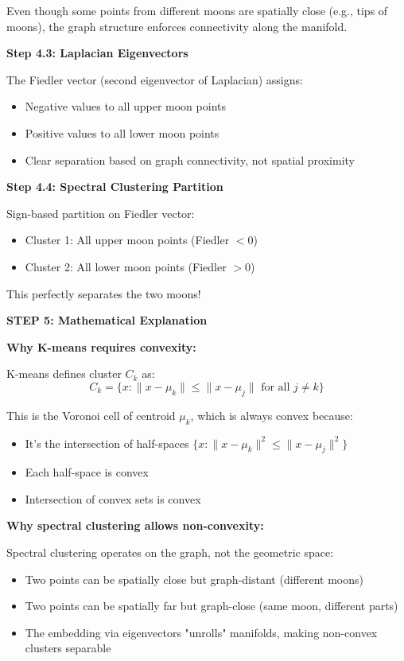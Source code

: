 \documentclass[12pt]{article}
\begin{document}
\begin{solution}
Even though some points from different moons are spatially close (e.g., tips of moons), the graph structure enforces connectivity along the manifold.

\textbf{Step 4.3: Laplacian Eigenvectors}

The Fiedler vector (second eigenvector of Laplacian) assigns:
\begin{itemize}
    \item Negative values to all upper moon points
    \item Positive values to all lower moon points
    \item Clear separation based on graph connectivity, not spatial proximity
\end{itemize}

\textbf{Step 4.4: Spectral Clustering Partition}

Sign-based partition on Fiedler vector:
\begin{itemize}
    \item Cluster 1: All upper moon points (Fiedler $< 0$)
    \item Cluster 2: All lower moon points (Fiedler $> 0$)
\end{itemize}

This perfectly separates the two moons!

\textbf{STEP 5: Mathematical Explanation}

\textbf{Why K-means requires convexity:}

K-means defines cluster $C_k$ as:
\[
C_k = \{x : \|x - \mu_k\| \leq \|x - \mu_j\| \text{ for all } j \neq k\}
\]

This is the Voronoi cell of centroid $\mu_k$, which is always convex because:
\begin{itemize}
    \item It's the intersection of half-spaces $\{x : \|x - \mu_k\|^2 \leq \|x - \mu_j\|^2\}$
    \item Each half-space is convex
    \item Intersection of convex sets is convex
\end{itemize}

\textbf{Why spectral clustering allows non-convexity:}

Spectral clustering operates on the graph, not the geometric space:
\begin{itemize}
    \item Two points can be spatially close but graph-distant (different moons)
    \item Two points can be spatially far but graph-close (same moon, different parts)
    \item The embedding via eigenvectors "unrolls" manifolds, making non-convex clusters separable
\end{itemize}


\end{solution}
\end{document}
